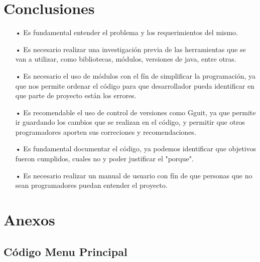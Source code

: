 \documentclass[times,12pt]{article}
\begin{document}



\section{Conclusiones}
\begin{enumerate}
 
\item[•] Es fundamental entender el problema y los requerimientos del mismo.
 
\item[•] Es necesario realizar una investigaci\'on previa de las herramientas que se van a utilizar, como bibliotecas, m\'odulos, versiones de java, entre otras.
 
\item[•] Es necesario el uso de m\'odulos con el f\'in de simplificar la programaci\'on, ya que nos permite ordenar el c\'odigo para que desarrollador pueda identificar en que parte de proyecto est\'an los errores.
 
\item[•]  Es recomendable el uso de control de versiones como Gguit, ya que permite ir guardando los cambios que se realizan en el c\'odigo, y permitir que otros programadores aporten sus correciones y recomendaciones.

\item[•] Es fundamental documentar el c\'odigo, ya podemos identificar  que objetivos fueron cumplidos, cuales no y poder justificar el "porque".

\item[•] Es necesario realizar un manual de usuario con f\'in de que personas que no sean programadores puedan entender el proyecto.

\end{enumerate}

\section{Anexos}

\subsection{C\'odigo Menu Principal}
\end{document}
